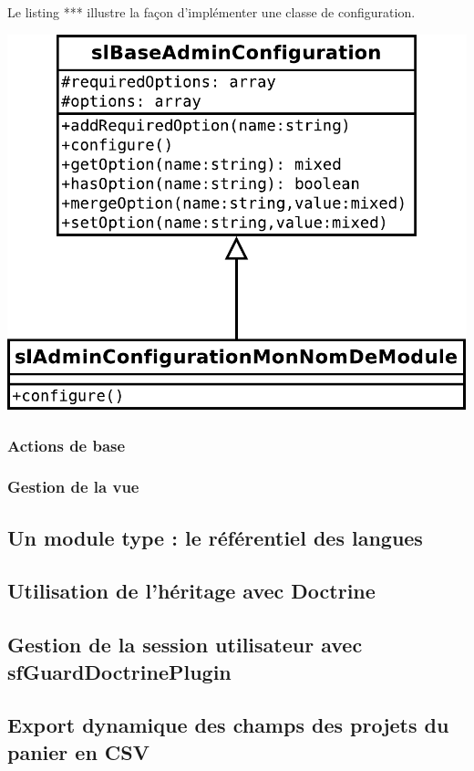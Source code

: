 Le listing *** illustre la façon d'implémenter une classe de configuration.

\includegraphics[]{figs/eyrolles_sladmin-config}

\subsubsection{Actions de base}

\subsubsection{Gestion de la vue}


\subsection{Un module type : le référentiel des langues}

\subsection{Utilisation de l'héritage avec Doctrine}

\subsection{Gestion de la session utilisateur avec sfGuardDoctrinePlugin}

\subsection{Export dynamique des champs des projets du panier en CSV}

